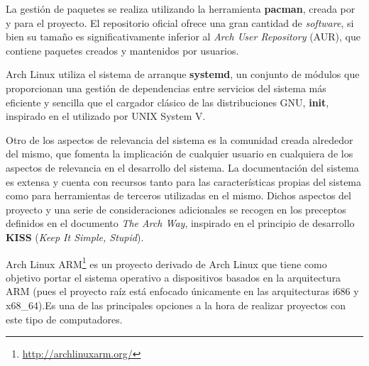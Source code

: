 
La gestión de paquetes se realiza utilizando la herramienta \textbf{pacman}\cite{pacman}, creada por y para el proyecto. El repositorio oficial ofrece una gran cantidad de \textit{software}, si bien su tamaño es significativamente inferior al \textit{Arch User Repository} (AUR), que contiene paquetes creados y mantenidos por usuarios.

Arch Linux utiliza el sistema de arranque \textbf{systemd}\cite{systemd}, un conjunto de módulos que proporcionan una gestión de dependencias entre servicios del sistema más eficiente y sencilla que el cargador clásico de las distribuciones GNU, \textbf{init}\cite{init}, inspirado en el utilizado por UNIX System V.

Otro de los aspectos de relevancia del sistema es la comunidad creada alrededor del mismo, que fomenta la implicación de cualquier usuario en cualquiera de los aspectos de relevancia en el desarrollo del sistema. La documentación del sistema es extensa y cuenta con recursos tanto para las características propias del sistema como para herramientas de terceros utilizadas en el mismo. Dichos aspectos del proyecto y una serie de consideraciones adicionales se recogen en los preceptos definidos en el documento \textit{The Arch Way}\cite{thearchway}, inspirado en el principio de desarrollo \textbf{KISS} (\textit{Keep It Simple, Stupid}).%

Arch Linux ARM\footnote{\href{http://archlinuxarm.org/}{http://archlinuxarm.org/}} es un proyecto derivado de Arch Linux que tiene como objetivo portar el sistema operativo a dispositivos basados en la arquitectura ARM (pues el proyecto raíz está enfocado únicamente en las arquitecturas i686 y x68\_64).Es una de las principales opciones a la hora de realizar proyectos con este tipo de computadores\cite{distrowatch:arm}. %

